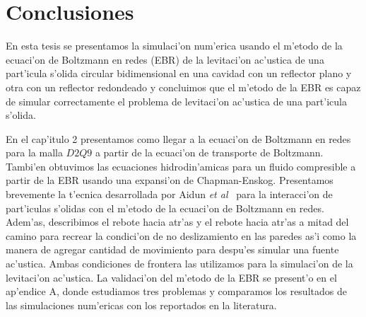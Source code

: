 \chapter{Conclusiones}


En esta tesis se presentamos la simulaci'on num'erica usando el m'etodo de la ecuaci'on
de Boltzmann en redes (EBR) de la levitaci'on ac'ustica de una part'icula s'olida circular
bidimensional en una cavidad con un reflector plano y otra con un reflector redondeado 
y concluimos que el m'etodo de la EBR es capaz de 
simular correctamente el problema de levitaci'on ac'ustica de una part'icula s'olida.

En el cap'itulo 2 presentamos como llegar a la ecuaci'on de Boltzmann en redes
para la malla $D2Q9$  a partir de la ecuaci'on de transporte de Boltzmann. Tambi'en
obtuvimos las ecuaciones hidrodin'amicas para un fluido compresible a partir de la 
EBR usando una expansi'on de Chapman-Enskog. Presentamos brevemente
la t'ecnica desarrollada por Aidun {\it et al}~\cite{aidun98} para la interacci'on
de part'iculas s'olidas con el m'etodo de la  ecuaci'on de Boltzmann en redes. Adem'as,
describimos el rebote hacia atr'as y el rebote hacia atr'as a mitad del camino para
recrear la condici'on de no deslizamiento en las paredes as'i como la manera
de agregar cantidad de movimiento para despu'es simular una fuente ac'ustica. 
Ambas condiciones de frontera  las utilizamos para la simulaci'on de la levitaci'on ac'ustica.
La validaci'on del m'etodo de la EBR se present'o en el ap'endice A, donde estudiamos tres
problemas y comparamos los resultados de las simulaciones num'ericas con los reportados
en la literatura.


